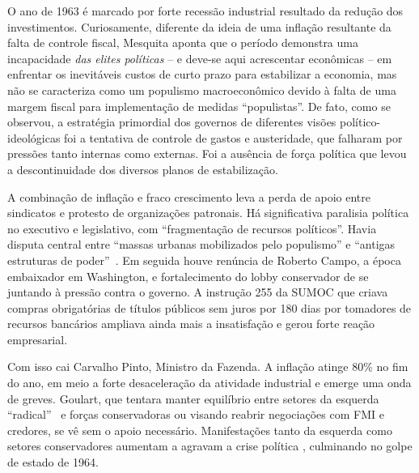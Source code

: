 O ano de 1963 é marcado por forte recessão industrial resultado da redução dos
investimentos. Curiosamente, diferente da ideia de uma inflação resultante da 
falta de controle fiscal, Mesquita \citeyearpar{mesquita_inflacao_2014} aponta que o período
demonstra uma incapacidade \emph{das elites políticas} -- e deve-se aqui acrescentar econômicas -- 
em enfrentar os inevitáveis custos de curto prazo para
estabilizar a economia, mas não se caracteriza como um populismo
macroeconômico devido à falta de uma margem fiscal para implementação de
medidas ``populistas''. De fato, como se observou, a estratégia primordial dos governos de
diferentes visões político-ideológicas foi a tentativa de controle de gastos e austeridade, que falharam por pressões tanto internas
como externas. Foi a ausência de força política que levou a descontinuidade dos diversos
planos de estabilização.

A combinação de inflação e fraco crescimento leva a perda de apoio
entre sindicatos e protesto de organizações patronais. Há significativa
paralisia política no executivo e legislativo, com ``fragmentação de
recursos políticos''. Havia disputa central entre ``massas urbanas
mobilizados pelo populismo'' e ``antigas estruturas de poder''~\citep[p.192]{viannavillela2015}.
Em seguida houve renúncia de Roberto Campo, a época embaixador em Washington, e fortalecimento do lobby
conservador de  se juntando à pressão contra o governo. A
instrução 255 da SUMOC que criava compras obrigatórias de títulos públicos
sem juros por 180 dias por tomadores de recursos bancários ampliava ainda mais a insatisfação
e gerou forte reação empresarial\citep{viannavillela2015}.

Com isso cai Carvalho Pinto, Ministro da Fazenda.
A inflação atinge 80\% no fim do ano, em meio a forte desaceleração da
atividade industrial e emerge uma onda de greves. Goulart, que tentara manter equilíbrio
entre setores da esquerda ``radical''~\citep[p.163]{viannavillela2015} e 
forças conservadoras ou visando reabrir negociações com FMI e
credores, se vê sem o apoio necessário. Manifestações tanto da esquerda 
como setores conservadores aumentam a
agravam a crise política \citep{mesquita_inflacao_2014,villela_dos_2025}, 
culminando no golpe de estado de 1964.


